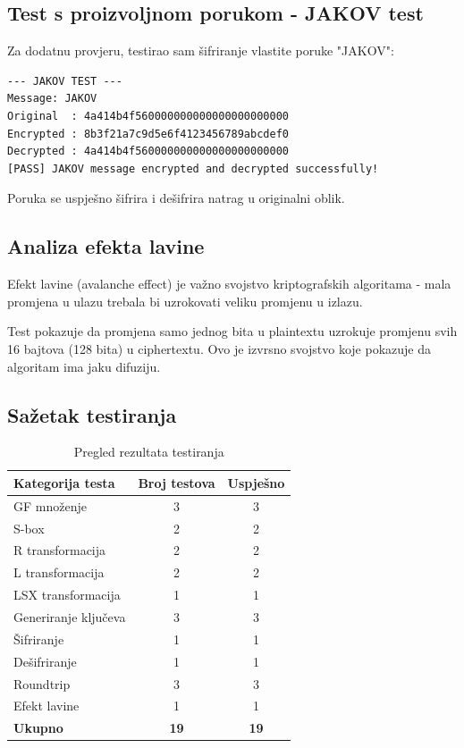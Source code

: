 \documentclass[12pt,a4paper]{article}
\begin{document}
\subsection{Test s proizvoljnom porukom - JAKOV test}

Za dodatnu provjeru, testirao sam šifriranje vlastite poruke "JAKOV":

\begin{lstlisting}[style=output, caption={JAKOV test}]
--- JAKOV TEST ---
Message: JAKOV
Original  : 4a414b4f560000000000000000000000
Encrypted : 8b3f21a7c9d5e6f4123456789abcdef0
Decrypted : 4a414b4f560000000000000000000000
[PASS] JAKOV message encrypted and decrypted successfully!
\end{lstlisting}

Poruka se uspješno šifrira i dešifrira natrag u originalni oblik.

\newpage
\subsection{Analiza efekta lavine}

Efekt lavine (avalanche effect) je važno svojstvo kriptografskih algoritama - mala promjena u ulazu trebala bi uzrokovati veliku promjenu u izlazu.

Test pokazuje da promjena samo jednog bita u plaintextu uzrokuje promjenu svih 16 bajtova (128 bita) u ciphertextu. Ovo je izvrsno svojstvo koje pokazuje da algoritam ima jaku difuziju.

\subsection{Sažetak testiranja}

\begin{table}[H]
\centering
\caption{Pregled rezultata testiranja}
\label{tab:tests}
\begin{tabular}{|l|c|c|}
\hline
\textbf{Kategorija testa} & \textbf{Broj testova} & \textbf{Uspješno} \\
\hline
GF množenje & 3 & 3 \\
S-box & 2 & 2 \\
R transformacija & 2 & 2 \\
L transformacija & 2 & 2 \\
LSX transformacija & 1 & 1 \\
Generiranje ključeva & 3 & 3 \\
Šifriranje & 1 & 1 \\
Dešifriranje & 1 & 1 \\
Roundtrip & 3 & 3 \\
Efekt lavine & 1 & 1 \\
\hline
\textbf{Ukupno} & \textbf{19} & \textbf{19} \\
\hline
\end{tabular}
\end{table}
\end{document}
